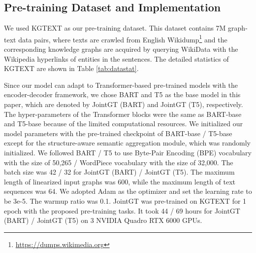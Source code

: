 \documentclass[11pt,a4paper]{article}
\begin{document}
\subsection{Pre-training Dataset and Implementation}

We used KGTEXT \cite{chen2020kgpt} as our pre-training dataset. This dataset contains 7M graph-text data pairs, where texts are crawled from English Wikidump\footnote{\url{https://dumps.wikimedia.org}} and the corresponding knowledge graphs are acquired by querying WikiData with the Wikipedia hyperlinks of entities in the sentences. The detailed statistics of KGTEXT are shown in Table \ref{tab:datastat}.


\begin{table} [!htp]
\centering
\scriptsize
{}
\caption{Statistics of pre-training and fine-tuning datasets, including the total number of entities and relations, the data split, the average number of triples, and the average length of texts.}
\label{tab:datastat}
\end{table}


Since our model can adapt to Transformer-based pre-trained models with the encoder-decoder framework, we chose BART \cite{lewis2020bart} and T5 \cite{raffel2020t5} as the base model in this paper, which are denoted by JointGT (BART) and JointGT (T5), respectively. The hyper-parameters of the Transformer blocks were the same as BART-base and T5-base because of the limited computational resources. We initialized our model parameters with the pre-trained checkpoint of BART-base / T5-base except for the structure-aware semantic aggregation module, which was randomly initialized.
We followed BART / T5 to use Byte-Pair Encoding (BPE) vocabulary \cite{radford2019gpt2} with the size of 50,265 /  WordPiece vocabulary \cite{kudo2018sentencepiece} with the size of 32,000. The batch size was 42 / 32 for JointGT (BART) / JointGT (T5). The maximum length of linearized input graphs was 600, while the maximum length of text sequences was 64. We adopted Adam \cite{kingma2015adam} as the optimizer and set the learning rate to be 3e-5. The warmup ratio was 0.1. JointGT was pre-trained on KGTEXT for 1 epoch with the proposed pre-training tasks. It took 44 / 69 hours for JointGT (BART) / JointGT (T5) on 3 NVIDIA Quadro RTX 6000 GPUs.
\end{document}
